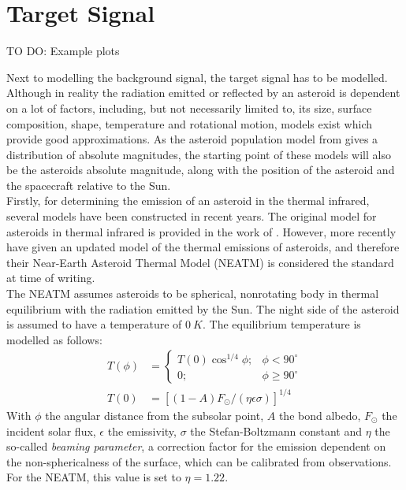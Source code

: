 \section{Target Signal}
\label{sec:modelling_target}

TO DO: Example plots

Next to modelling the background signal, the target signal has to be modelled. Although in reality the radiation emitted or reflected by an asteroid is dependent on a lot of factors, including, but not necessarily limited to, its size, surface composition, shape, temperature and rotational motion, models exist which provide good approximations. As the asteroid population model from \cite{GranvikPopulation} gives a distribution of absolute magnitudes, the starting point of these models will also be the asteroids absolute magnitude, along with the position of the asteroid and the spacecraft relative to the Sun. \\

Firstly, for determining the emission of an asteroid in the thermal infrared, several models have been constructed in recent years. The original model for asteroids in thermal infrared is provided in the work of \cite{AsteroidSTM}. However, more recently \cite{AsteroidNEATM} have given an updated model of the thermal emissions of asteroids, and therefore their Near-Earth Asteroid Thermal Model (NEATM) is considered the standard at time of writing. \\

The NEATM assumes asteroids to be spherical, nonrotating body in thermal equilibrium with the radiation emitted by the Sun. The night side of the asteroid is assumed to have a temperature of $0~K$. The equilibrium temperature is modelled as follows:
\begin{align}
 T(\phi) &= \begin{cases}
            T(0) \cos ^{1/4} \phi;& \phi < 90^\circ \\
            0;& \phi \geq 90^\circ
           \end{cases} \\
T(0) &= \left[(1-A)F_{\odot}/(\eta \epsilon \sigma)\right]^{1/4}
\end{align}
With $\phi$ the angular distance from the subsolar point, $A$ the bond albedo, $F_{\odot}$ the incident solar flux, $\epsilon$ the emissivity, $\sigma$ the Stefan-Boltzmann constant and $\eta$ the so-called \textit{beaming parameter}, a correction factor for the emission dependent on the non-sphericalness of the surface, which can be calibrated from observations. For the NEATM, this value is set to $\eta = 1.22$.\\

